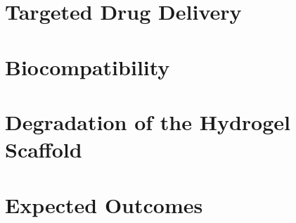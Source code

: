 \documentclass[
    letterpaper,
    10pt,
    unnumberedsections,
    twoside
]{LTJournalArticle}
\begin{document}
    \section{Targeted Drug Delivery}

    

    \section{Biocompatibility}

    

    \section{Degradation of the Hydrogel Scaffold}

    


    

    \section{Expected Outcomes}

    

    \onecolumn
    \printbibliography
\end{document}
